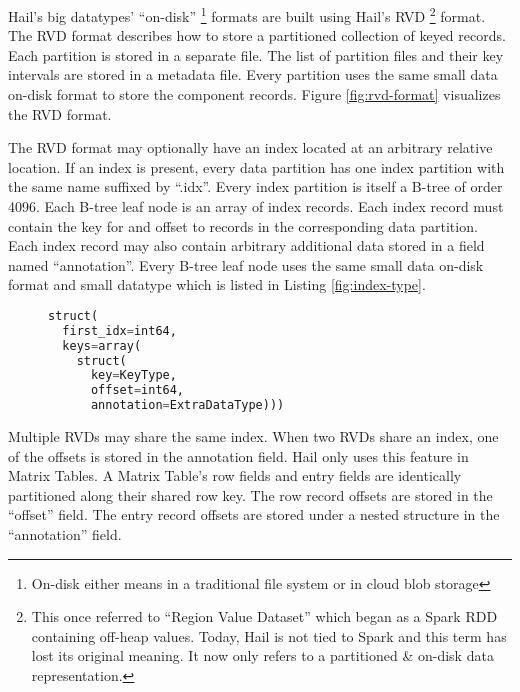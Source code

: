 \documentclass[10pt,a4paper%
]{article}
\begin{document}
Hail's big datatypes' ``on-disk''%
\footnote{On-disk either means in a traditional file system or in cloud blob storage}
formats are built using Hail's RVD%
\footnote{
This once referred to ``Region Value Dataset'' which began as a Spark RDD containing off-heap values.
Today, Hail is not tied to Spark and this term has lost its original meaning.
It now only refers to a partitioned \& on-disk data representation.
}
format.
The RVD format describes how to store a partitioned collection of keyed records.
Each partition is stored in a separate file.
The list of partition files and their key intervals are stored in a metadata file.
Every partition uses the same small data on-disk format to store the component records.
Figure \ref{fig:rvd-format} visualizes the RVD format.

The RVD format may optionally have an index located at an arbitrary relative location.
If an index is present, every data partition has one index partition with the same name suffixed by ``.idx''.
Every index partition is itself a B-tree of order 4096.
Each B-tree leaf node is an array of index records.
Each index record must contain the key for and offset to records in the corresponding data partition.
Each index record may also contain arbitrary additional data stored in a field named ``annotation''.
Every B-tree leaf node uses the same small data on-disk format and small datatype which is listed in Listing \ref{fig:index-type}.

\begin{figure}[h]
\begin{lstlisting}[language=Python, caption=The type of an RVD index file., label=fig:index-type]
struct(
  first_idx=int64,
  keys=array(
    struct(
      key=KeyType,
      offset=int64,
      annotation=ExtraDataType)))
\end{lstlisting}
\end{figure}

Multiple RVDs may share the same index.
When two RVDs share an index, one of the offsets is stored in the annotation field.
Hail only uses this feature in Matrix Tables.
A Matrix Table's row fields and entry fields are identically partitioned along their shared row key.
The row record offsets are stored in the ``offset'' field.
The entry record offsets are stored under a nested structure in the ``annotation'' field.
\end{document}
